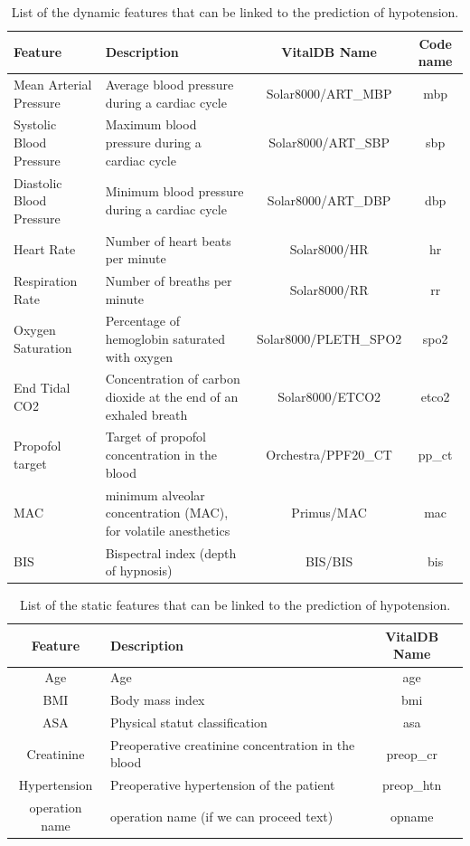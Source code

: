 \documentclass[a4paper,12pt]{article}
\begin{document}
\begin{table}
\small
\begin{center}
\center
{}
\begin{tabular}{p{}|p{}|c|c}
\textbf{Feature} & \textbf{Description} & \textbf{VitalDB Name} & \textbf{Code name} \\
\midrule
Mean Arterial Pressure & Average blood pressure during a cardiac cycle & Solar8000/ART\_MBP & mbp\\
Systolic Blood Pressure & Maximum blood pressure during a cardiac cycle & Solar8000/ART\_SBP & sbp \\
Diastolic Blood Pressure & Minimum blood pressure during a cardiac cycle & Solar8000/ART\_DBP & dbp \\
Heart Rate & Number of heart beats per minute & Solar8000/HR & hr\\
Respiration Rate & Number of breaths per minute & Solar8000/RR & rr\\
Oxygen Saturation & Percentage of hemoglobin saturated with oxygen & Solar8000/PLETH\_SPO2 & spo2 \\
End Tidal CO2 & Concentration of carbon dioxide at the end of an exhaled breath & Solar8000/ETCO2 & etco2 \\
Propofol target & Target of propofol concentration in the blood & Orchestra/PPF20\_CT & pp\_ct\\
 MAC & minimum alveolar concentration (MAC), for volatile anesthetics &  Primus/MAC & mac\\
 BIS & Bispectral index (depth of hypnosis) & BIS/BIS & bis
\end{tabular}
\caption{List of the dynamic features that can be linked to the prediction of hypotension.}
\end{center}
\end{table}

\begin{table}
\begin{center}
\begin{tabular}{c|p{}|c}
\textbf{Feature} & \textbf{Description} & \textbf{VitalDB Name} \\
\midrule
Age & Age & age \\
BMI & Body mass index & bmi \\
ASA & Physical statut classification & asa \\
Creatinine & Preoperative creatinine concentration in the blood & preop\_cr \\
Hypertension & Preoperative hypertension of the patient & preop\_htn \\
operation name & operation name (if we can proceed text) & opname
\end{tabular}
\caption{List of the static features that can be linked to the prediction of hypotension.}
\end{center}
\end{table}
\end{document}
